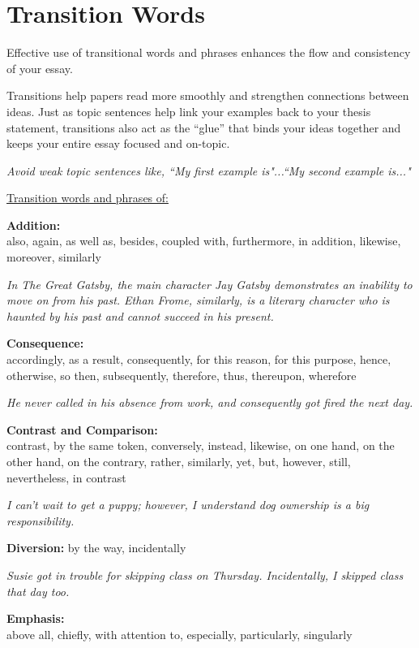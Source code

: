\documentclass[12pt]{book}
\begin{document}
\section{Transition Words}
Effective use of transitional words and phrases enhances the flow and consistency of your essay. 

\bigskip
Transitions help papers read more smoothly and strengthen connections between ideas.  Just as topic sentences help link your examples back to your thesis statement, transitions also act as the “glue” that binds your ideas together and keeps your entire essay focused and on-topic.

\bigskip
\textit{Avoid weak topic sentences like, ``My first example is"...``My second example is..."}

\bigskip
\underline{Transition words and phrases of:}

\bigskip
\textbf{Addition:}\\
also, again, as well as, besides, coupled with, furthermore, in addition, likewise, moreover, similarly

\bigskip
\textit{In The Great Gatsby, the main character Jay Gatsby demonstrates an inability to move on from his past.  Ethan Frome, similarly, is a literary character who is haunted by his past and cannot succeed in his present.}

\bigskip
\textbf{Consequence:}\\
accordingly, as a result, consequently, for this reason, for this purpose, hence, otherwise, so then, subsequently, therefore, thus, thereupon, wherefore

\bigskip
\textit{He never called in his absence from work, and consequently got fired the next day.}

\bigskip
\textbf{Contrast and Comparison:}\\
contrast, by the same token, conversely, instead, likewise, on one hand, on the other hand, on the contrary, rather, similarly, yet, but, however, still, nevertheless, in contrast

\bigskip
\textit{I can't wait to get a puppy; however, I understand dog ownership is a big responsibility.}

\bigskip
\textbf{Diversion:}
by the way, incidentally

\bigskip
\textit{Susie got in trouble for skipping class on Thursday.  Incidentally, I skipped class that day too.}

\bigskip
\textbf{Emphasis:}\\
above all, chiefly, with attention to, especially, particularly, singularly
\end{document}

